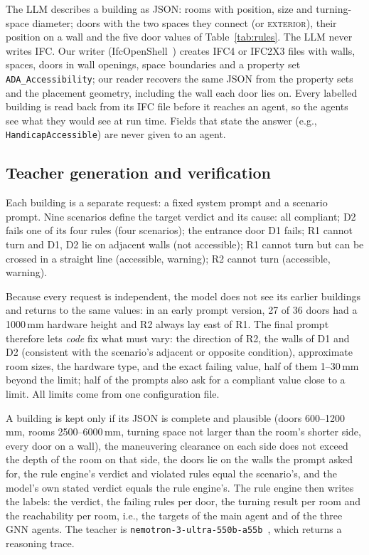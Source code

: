 \documentclass[conference]{IEEEtran}
\begin{document}
The LLM describes a building as JSON: rooms with position, size and turning-space diameter; doors with the two
spaces they connect (or \textsc{exterior}), their position on a wall and the five door values of
Table~\ref{tab:rules}. The LLM never writes IFC. Our writer (IfcOpenShell~\cite{ifcopenshell}) creates IFC4 or
IFC2X3 files with walls, spaces, doors in wall openings, space boundaries and a property set
\texttt{ADA\_Accessibility}; our reader recovers the same JSON from the property sets and the placement geometry,
including the wall each door lies on. Every labelled building is read back from its IFC file before it reaches an
agent, so the agents see what they would see at run time. Fields that state the answer (e.g.,
\texttt{HandicapAccessible}) are never given to an agent.

\subsection{Teacher generation and verification}

Each building is a separate request: a fixed system prompt and a scenario prompt. Nine scenarios define the
target verdict and its cause: all compliant; D2 fails one of its four rules (four scenarios); the entrance door D1
fails; R1 cannot turn and D1, D2 lie on adjacent walls (not accessible); R1 cannot turn but can be crossed in a
straight line (accessible, warning); R2 cannot turn (accessible, warning).

Because every request is independent, the model does not see its earlier buildings and returns to the same values:
in an early prompt version, 27 of 36 doors had a 1000\,mm hardware height and R2 always lay east of R1. The final
prompt therefore lets \emph{code} fix what must vary: the direction of R2, the walls of D1 and D2 (consistent with
the scenario's adjacent or opposite condition), approximate room sizes, the hardware type, and the exact failing
value, half of them 1--30\,mm beyond the limit; half of the prompts also ask for a compliant value close to a
limit. All limits come from one configuration file.

A building is kept only if its JSON is complete and plausible (doors 600--1200\,mm, rooms 2500--6000\,mm,
turning space not larger than the room's shorter side, every door on a wall), the maneuvering clearance on each side
does not exceed the depth of the room on that side, the doors lie on the walls the prompt asked for, the rule
engine's verdict and violated rules equal the scenario's, and the model's own stated verdict equals the rule
engine's. The rule engine then writes the labels: the verdict, the failing rules per door, the turning result per
room and the reachability per room, i.e., the targets of the main agent and of the three GNN agents.
The teacher is \texttt{nemotron-3-ultra-550b-a55b}~\cite{nemotron}, which returns a reasoning trace.
\end{document}
